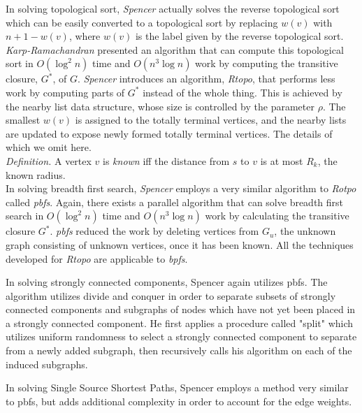 \documentclass[paper=a4, fontsize=11pt]{scrartcl} %
\numberwithin{equation}{section} %
\numberwithin{figure}{section} %
\numberwithin{table}{section} %
\begin{document}
In solving topological sort, \textit{Spencer\cite{S97}} actually solves the reverse topological sort which can be easily converted to a topological sort by replacing $w(v)$ with $n + 1 - w(v)$, where $w(v)$ is the label given by the reverse topological sort. \textit{Karp-Ramachandran\cite{KR90}} presented an algorithm that can compute this topological sort in $O(\log^2{n})$ time and $O(n^3\log{n})$ work by computing the transitive closure, $G^*$, of $G$. \textit{Spencer\cite{S97}} introduces an algorithm, \textit{Rtopo}, that performs less work by computing parts of $G^*$ instead of the whole thing. This is achieved by the nearby list data structure, whose size is controlled by the parameter $\rho$. The smallest $w(v)$ is assigned to the totally terminal vertices, and the nearby lists are updated to expose newly formed totally terminal vertices. The details of which we omit here.\\   

\textit{Definition.} A vertex $v$ is \textit{known} iff the distance from $s$ to $v$ is at most $R_k$, the known radius.\\

In solving breadth first search, \textit{Spencer\cite{S97}} employs a very similar algorithm to \textit{Rotpo} called \textit{pbfs}. Again, there exists a parallel algorithm that can solve breadth first search in $O(\log^2{n})$ time and $O(n^3\log{n})$ work by calculating the transitive closure $G^*$. \textit{pbfs} reduced the work by deleting vertices from $G_u$, the unknown graph consisting of unknown vertices, once it has been known. All the techniques developed for \textit{Rtopo} are applicable to \textit{bpfs}. 

In solving strongly connected components, Spencer again utilizes pbfs. The algorithm utilizes divide and conquer in order to separate subsets of strongly connected components and subgraphs of nodes which have not yet been placed in a strongly connected component. He first applies a procedure called "split" which utilizes uniform randomness to select a strongly connected component to separate from a newly added subgraph, then recursively calls his algorithm on each of the induced subgraphs. 

In solving Single Source Shortest Paths, Spencer employs a method very similar to pbfs, but adds additional complexity in order to account for the edge weights. 

\end{document}
